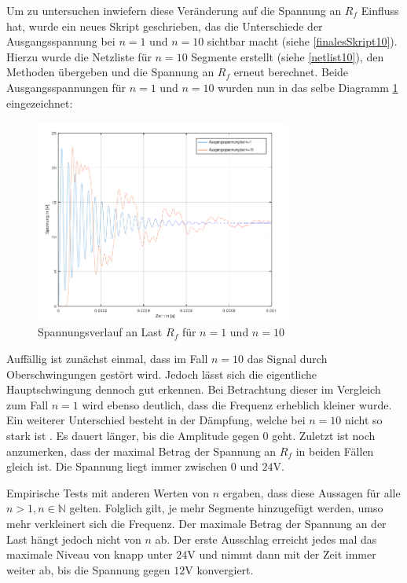 \newpage
Um zu untersuchen inwiefern diese Veränderung auf die Spannung an $R_f$ Einfluss hat, wurde ein neues Skript geschrieben, das die Unterschiede der Ausgangsspannung bei $n=1$ und $n=10$ sichtbar macht (siehe \ref{finalesSkript10}). Hierzu wurde die Netzliste für $n=10$ Segmente erstellt (siehe \ref{netlist10}), den Methoden übergeben und die Spannung an $R_f$ erneut berechnet.
Beide Ausgangsspannungen für $n=1$ und $n=10$ wurden nun in das selbe Diagramm \ref{plottKK10} eingezeichnet:

\begin{figure}[h]
	\centering
	\includegraphics[width=0.75\textwidth]{data/plotKK10}
	\caption{Spannungsverlauf an Last $R_f$ für $n=1$ und $n=10$}
	\label{plottKK10}
\end{figure}

Auffällig ist zunächst einmal, dass im Fall $n=10$ das Signal durch Oberschwingungen gestört wird. Jedoch lässt sich die eigentliche Hauptschwingung dennoch gut erkennen. Bei Betrachtung dieser im Vergleich zum Fall $n=1$ wird ebenso deutlich, dass die Frequenz erheblich kleiner wurde. Ein weiterer Unterschied besteht in der Dämpfung, welche bei $n=10$ nicht so stark ist . Es dauert länger, bis die Amplitude gegen $0$ geht. Zuletzt ist noch anzumerken, dass der maximal Betrag der Spannung an $R_f$ in beiden Fällen gleich ist. Die Spannung liegt immer zwischen $0$ und $24\si{\volt}$.

Empirische Tests mit anderen Werten von $n$ ergaben, dass diese Aussagen für alle $n>1, n \in \mathbb{N}$ gelten. Folglich gilt, je mehr Segmente hinzugefügt werden, umso mehr verkleinert sich die Frequenz. Der maximale Betrag der Spannung an der Last hängt jedoch nicht von $n$ ab. Der erste Ausschlag erreicht jedes mal das maximale Niveau von knapp unter $24\si{\volt}$ und nimmt dann mit der Zeit immer weiter ab, bis die Spannung gegen $12\si{\volt}$ konvergiert.